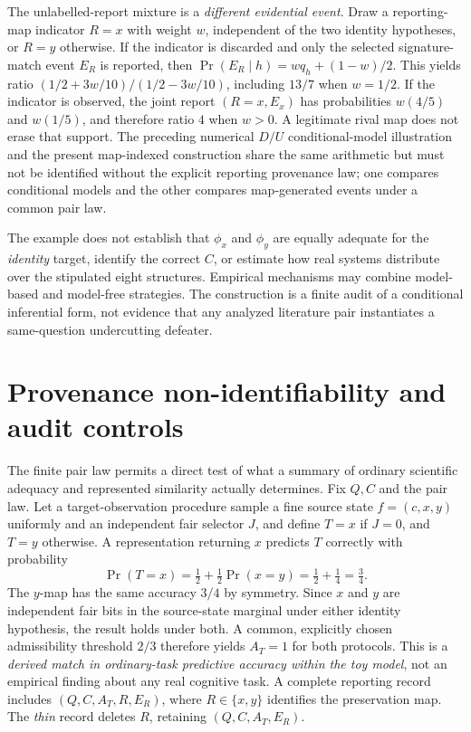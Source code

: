 \documentclass[11pt]{article}
\begin{document}
The unlabelled-report mixture is a \emph{different evidential event}. Draw a reporting-map indicator \(R=x\) with weight \(w\), independent of the two identity hypotheses, or \(R=y\) otherwise. If the indicator is discarded and only the selected signature-match event \(E_R\) is reported, then \(\Pr(E_R\mid h)=wq_h+(1-w)/2\). This yields ratio \((1/2+3w/10)/(1/2-3w/10)\), including \(13/7\) when \(w=1/2\). If the indicator is observed, the joint report \((R=x,E_x)\) has probabilities \(w(4/5)\) and \(w(1/5)\), and therefore ratio \(4\) when \(w>0\). A legitimate rival map does not erase that support. The preceding numerical \(D/U\) conditional-model illustration and the present map-indexed construction share the same arithmetic but must not be identified without the explicit reporting provenance law; one compares conditional models and the other compares map-generated events under a common pair law.

The example does not establish that \(\phi_x\) and \(\phi_y\) are equally adequate for the \emph{identity} target, identify the correct \(C\), or estimate how real systems distribute over the stipulated eight structures. Empirical mechanisms may combine model-based and model-free strategies. The construction is a finite audit of a conditional inferential form, not evidence that any analyzed literature pair instantiates a same-question undercutting defeater.


\section{Provenance non-identifiability and audit controls}

The finite pair law permits a direct test of what a summary of ordinary scientific adequacy and represented similarity actually determines. Fix \(Q,C\) and the pair law. Let a target-observation procedure sample a fine source state \(f=(c,x,y)\) uniformly and an independent fair selector \(J\), and define \(T=x\) if \(J=0\), and \(T=y\) otherwise. A representation returning \(x\) predicts \(T\) correctly with probability
\[
\Pr(T=x)=\tfrac12+\tfrac12\Pr(x=y)
=\tfrac12+\tfrac14=\tfrac34.
\]
The \(y\)-map has the same accuracy \(3/4\) by symmetry. Since \(x\) and \(y\) are independent fair bits in the source-state marginal under either identity hypothesis, the result holds under both. A common, explicitly chosen admissibility threshold \(2/3\) therefore yields \(A_T=1\) for both protocols. This is a \emph{derived match in ordinary-task predictive accuracy within the toy model}, not an empirical finding about any real cognitive task. A complete reporting record includes \((Q,C,A_T,R,E_R)\), where \(R\in\{x,y\}\) identifies the preservation map. The \emph{thin} record deletes \(R\), retaining \((Q,C,A_T,E_R)\).
\end{document}
